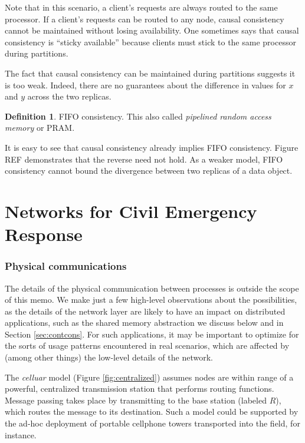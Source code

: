 \documentclass[]             %
{NASA}                       %
\theoremstyle{definition}
\newtheorem{definition}{Definition}[section]
\begin{document}
Note that in this scenario, a client's requests are always routed to the
same processor. If a client's requests can be routed to any node, causal
consistency cannot be maintained without losing availability. One
sometimes says that causal consistency is ``sticky available'' because
clients must stick to the same processor during partitions.

The fact that causal consistency can be maintained during partitions
suggests it is too weak. Indeed, there are no guarantees about the
difference in values for \(x\) and \(y\) across the two replicas.

\begin{definition}
    FIFO consistency. This also called \emph{pipelined random access memory} or PRAM.
\end{definition}

It is easy to see that causal consistency already implies FIFO
consistency. Figure REF demonstrates that the reverse need not hold. As
a weaker model, FIFO consistency cannot bound the divergence between two
replicas of a data object.

\hypertarget{networks-for-civil-emergency-response}{%
\section{Networks for Civil Emergency
Response}\label{networks-for-civil-emergency-response}}

\hypertarget{physical-communications}{%
\subsubsection{Physical communications}\label{physical-communications}}

The details of the physical communication between processes is outside
the scope of this memo. We make just a few high-level observations about
the possibilities, as the details of the network layer are likely to
have an impact on distributed applications, such as the shared memory
abstraction we discuss below and in Section \ref{sec:contcons}. For such
applications, it may be important to optimize for the sorts of usage
patterns encountered in real scenarios, which are affected by (among
other things) the low-level details of the network.

The \emph{celluar} model (Figure \ref{fig:centralized}) assumes nodes
are within range of a powerful, centralized transmission station that
performs routing functions. Message passing takes place by transmitting
to the base station (labeled \(R\)), which routes the message to its
destination. Such a model could be supported by the ad-hoc deployment of
portable cellphone towers transported into the field, for instance.
\end{document}
